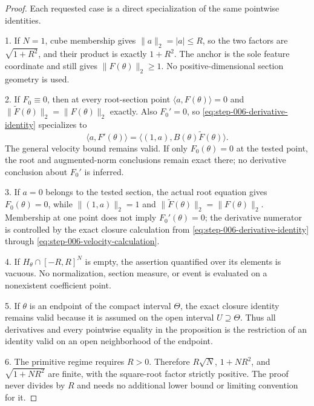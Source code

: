 \begin{proof}
Each requested case is a direct specialization of the same pointwise identities.

1. If \(N=1\), cube membership gives \(\lVert a\rVert_2=\lvert a\rvert\leq R\), so the two factors are
   \(\sqrt{1+R^2}\), and their product is exactly \(1+R^2\). The anchor is the sole feature coordinate and
   still gives \(\lVert F(\theta)\rVert_2\geq1\). No positive-dimensional section geometry is used.

2. If \(F_0\equiv0\), then at every root-section point
   \(\langle a,F(\theta)\rangle=0\) and
   \(\lVert\widetilde F(\theta)\rVert_2=\lVert F(\theta)\rVert_2\) exactly. Also \(F_0'=0\), so
   \eqref{eq:step-006-derivative-identity}
   specializes to
\begin{equation}
\label{eq:appendix-indented-002}
   \langle a,F'(\theta)\rangle
   =\langle(1,a),B(\theta)\widetilde F(\theta)\rangle.
\end{equation}
   The general velocity bound remains valid. If only \(F_0(\theta)=0\) at the tested point, the root and
   augmented-norm conclusions remain exact there; no derivative conclusion about \(F_0'\) is inferred.

3. If \(a=0\) belongs to the tested section, the actual root equation gives \(F_0(\theta)=0\), while
   \(\lVert(1,a)\rVert_2=1\) and
   \(\lVert\widetilde F(\theta)\rVert_2=\lVert F(\theta)\rVert_2\). Membership at one point does not imply
   \(F_0'(\theta)=0\); the derivative numerator is controlled by the exact
   closure calculation from \eqref{eq:step-006-derivative-identity} through
   \eqref{eq:step-006-velocity-calculation}.

4. If \(H_\theta\cap[-R,R]^N\) is empty, the assertion quantified over its elements is vacuous. No
   normalization, section measure, or event is evaluated on a nonexistent coefficient point.

5. If \(\theta\) is an endpoint of the compact interval \(\Theta\), the exact closure identity remains valid
   because it is assumed on the open interval \(U\supseteq\Theta\). Thus all derivatives and every pointwise
   equality in the proposition is the restriction of an identity valid on an open neighborhood of the endpoint.

6. The primitive regime requires \(R>0\). Therefore \(R\sqrt N\), \(1+NR^2\), and
   \(\sqrt{1+NR^2}\) are finite, with the square-root factor strictly positive. The proof never divides by
   \(R\) and needs no additional lower bound or limiting convention for it.


\end{proof}
